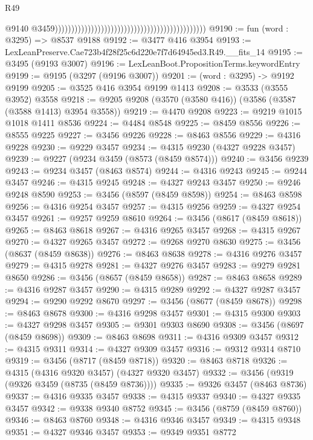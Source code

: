 \begin{lexlean}{R49}
\begin{coremodule}
                                                                                                @9140
                                                                                                @3459))))))))))))))))))))))))))))))))))))))))))))))
@9190 := fun (word : @3295) => @8537 @9188
@9192 := @3477 @416 @3954
@9193 := LexLeanPreserve.Cae723b4f28f25c6d220e7f7d64945ed3.R49.__fits_14
@9195 := @3495 (@9193 @3007)
@9196 := LexLeanBoot.PropositionTerms.keywordEntry
@9199 := @9195 (@3297 (@9196 @3007))
@9201 := (word : @3295) -> @9192 @9199
@9205 := @3525 @416 @3954 @9199 @1413
@9208 := @3533 (@3555 @3952) @3558
@9218 := @9205 @9208 (@3570 (@3580 @416)) (@3586 (@3587 (@3588 @1413) @3954 @3558))
@9219 := @4470 @9208
@9223 := @9219 @1015 @1018 @1411 @8536
@9224 := @4484 @8548
@9225 := @8459 @8556
@9226 := @8555 @9225
@9227 := @3456 @9226
@9228 := @8463 @8556
@9229 := @4316 @9228
@9230 := @9229 @3457
@9234 := @4315 @9230 (@4327 @9228 @3457)
@9239 := @9227 (@9234 @3459 (@8573 (@8459 @8574)))
@9240 := @3456 @9239
@9243 := @9234 @3457 (@8463 @8574)
@9244 := @4316 @9243
@9245 := @9244 @3457
@9246 := @4315 @9245
@9248 := @4327 @9243 @3457
@9250 := @9246 @9248 @8590
@9253 := @3456 (@8597 (@8459 @8598))
@9254 := @8463 @8598
@9256 := @4316 @9254 @3457
@9257 := @4315 @9256
@9259 := @4327 @9254 @3457
@9261 := @9257 @9259 @8610
@9264 := @3456 (@8617 (@8459 @8618))
@9265 := @8463 @8618
@9267 := @4316 @9265 @3457
@9268 := @4315 @9267
@9270 := @4327 @9265 @3457
@9272 := @9268 @9270 @8630
@9275 := @3456 (@8637 (@8459 @8638))
@9276 := @8463 @8638
@9278 := @4316 @9276 @3457
@9279 := @4315 @9278
@9281 := @4327 @9276 @3457
@9283 := @9279 @9281 @8650
@9286 := @3456 (@8657 (@8459 @8658))
@9287 := @8463 @8658
@9289 := @4316 @9287 @3457
@9290 := @4315 @9289
@9292 := @4327 @9287 @3457
@9294 := @9290 @9292 @8670
@9297 := @3456 (@8677 (@8459 @8678))
@9298 := @8463 @8678
@9300 := @4316 @9298 @3457
@9301 := @4315 @9300
@9303 := @4327 @9298 @3457
@9305 := @9301 @9303 @8690
@9308 := @3456 (@8697 (@8459 @8698))
@9309 := @8463 @8698
@9311 := @4316 @9309 @3457
@9312 := @4315 @9311
@9314 := @4327 @9309 @3457
@9316 := @9312 @9314 @8710
@9319 := @3456 (@8717 (@8459 @8718))
@9320 := @8463 @8718
@9326 := @4315 (@4316 @9320 @3457) (@4327 @9320 @3457)
@9332 := @3456 (@9319 (@9326 @3459 (@8735 (@8459 @8736))))
@9335 := @9326 @3457 (@8463 @8736)
@9337 := @4316 @9335 @3457
@9338 := @4315 @9337
@9340 := @4327 @9335 @3457
@9342 := @9338 @9340 @8752
@9345 := @3456 (@8759 (@8459 @8760))
@9346 := @8463 @8760
@9348 := @4316 @9346 @3457
@9349 := @4315 @9348
@9351 := @4327 @9346 @3457
@9353 := @9349 @9351 @8772

\end{coremodule}
\end{lexlean}
